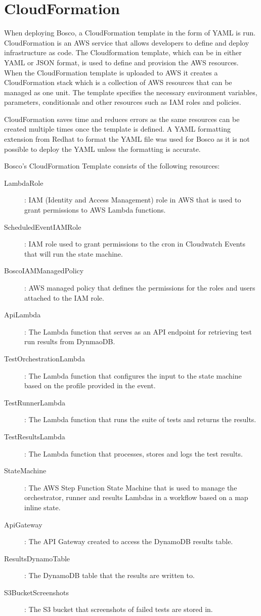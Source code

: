 \documentclass[12pt,a4paper,titlepage]{report}
\begin{document}
\section{CloudFormation}
When deploying Bosco, a  CloudFormation template in the form of YAML is run.  CloudFormation is an AWS service that allows developers to define and deploy infrastructure as code.
The Cloudformation template, which can be in either YAML or JSON format, is used to define and provision the AWS resources. When the CloudFormation template is uploaded to AWS it 
creates a CloudFormation stack which is a collection of AWS resources that can be managed as one unit. 
The template specifies the necessary environment variables, parameters, conditionals and other resources such as IAM roles and policies. 

CloudFormation saves time and reduces errors as the same resources can be created multiple times once the template is defined.
A YAML formatting extension from Redhat to format the YAML file was used for Bosco as it is not possible to deploy the YAML unless the formatting is accurate.

Bosco's CloudFormation Template consists of the following resources:

\begin{description}
  \item [LambdaRole]: IAM (Identity and Access Management) role in AWS that is used to grant permissions to AWS Lambda functions.
  \item [ScheduledEventIAMRole]: IAM role used to grant permissions to the cron in Cloudwatch Events that will run the state machine.
  \item [BoscoIAMManagedPolicy]: AWS managed policy that defines the permissions for the roles and users attached to the IAM role.
  \item [ApiLambda]: The Lambda function that serves as an API endpoint for retrieving test run results from DynmaoDB.
  \item [TestOrchestrationLambda]: The Lambda function that configures the input to the state machine based on the profile provided in the event.
  \item [TestRunnerLambda]: The Lambda function that runs the suite of tests and returns the results.
  \item [TestResultsLambda]: The Lambda function that processes, stores and logs the test results.
  \item [StateMachine]: The AWS Step Function State Machine that is used to manage the orchestrator, runner and results Lambdas in a workflow based on a map inline state. 
  \item [ApiGateway]: The API Gateway created to access the DynamoDB results table.
  \item [ResultsDynamoTable]: The DynamoDB table that the results are written to.
  \item [S3BucketScreenshots]: The S3 bucket that screenshots of failed tests are stored in.
\end{description}
\end{document}
